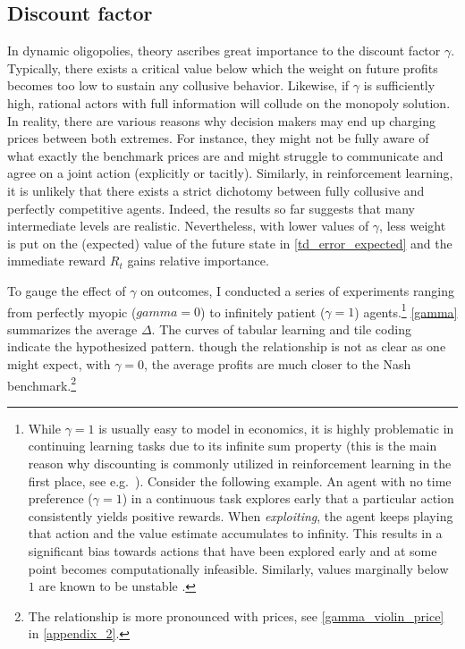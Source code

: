 \subsection{Discount factor}

In dynamic oligopolies, theory ascribes great importance to the discount factor $\gamma$. Typically, there exists a critical value below which the weight on future profits becomes too low to sustain any collusive behavior. Likewise, if $\gamma$ is sufficiently high, rational actors with full information will collude on the monopoly solution. In reality, there are various reasons why decision makers may end up charging prices between both extremes. For instance, they might not be fully aware of what exactly the benchmark prices are and might struggle to communicate and agree on a joint action (explicitly or tacitly). Similarly, in reinforcement learning, it is unlikely that there exists a strict dichotomy between fully collusive and perfectly competitive agents. Indeed, the results so far suggests that many intermediate levels are realistic. Nevertheless, with lower values of $\gamma$, less weight is put on the (expected) value of the future state in \autoref{td_error_expected} and the immediate reward $R_t$ gains relative importance.

To gauge the effect of $\gamma$ on outcomes, I conducted a series of experiments ranging from perfectly myopic ($gamma =0$) to infinitely patient ($\gamma = 1$) agents.\footnote{While $\gamma = 1$ is usually easy to model in economics, it is highly problematic in continuing learning tasks due to its infinite sum property (this is the main reason why discounting is commonly utilized in reinforcement learning in the first place, see e.g.\ \textcite{schwartz_reinforcement_1993}). Consider the following example. An agent with no time preference ($\gamma = 1$) in a continuous task explores  early that a particular action consistently yields positive rewards. When \emph{exploiting}, the agent keeps playing that action and the value estimate accumulates to infinity. This results in a significant bias towards actions that have been explored early and at some point becomes computationally infeasible. Similarly, values marginally below $1$ are known to be unstable \parencite{naik_discounted_2019}.} \autoref{gamma} summarizes the average $\Delta$. The curves of tabular learning and tile coding indicate the hypothesized pattern. though the relationship is not as clear as one might expect, with $\gamma = 0$, the average profits are much closer to the Nash benchmark.\footnote{The relationship is more pronounced with prices, see \autoref{gamma_violin_price} in \autoref{appendix_2}.}


